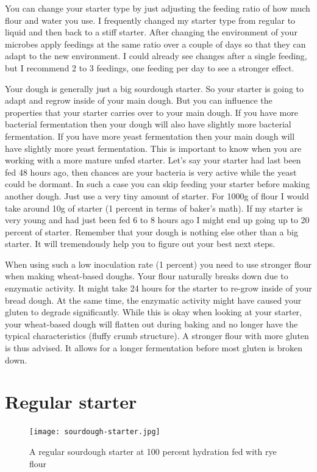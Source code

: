 You can change your starter type by just adjusting the feeding ratio of how
much flour and water you use. I frequently changed my starter type from
regular to liquid and then back to a stiff starter. After changing the
environment of your microbes apply feedings at the same ratio over a couple of
days so that they can adapt to the new environment. I could already see
changes after a single feeding, but I recommend 2 to 3 feedings, one feeding per
day to see a stronger effect.

Your dough is generally just a big sourdough starter. So your starter is going
to adapt and regrow inside of your main dough. But you can influence the
properties that your starter carries over to your main dough. If you have more
bacterial fermentation then your dough will also have slightly more bacterial
fermentation. If you have more yeast fermentation then your main dough will
have slightly more yeast fermentation. This is important to know when you are
working with a more mature unfed starter. Let's say your starter had last been
fed 48 hours ago, then chances are your bacteria is very active while the
yeast could be dormant. In such a case you can skip feeding your starter
before making another dough. Just use a very tiny amount of starter. For 1000g
of flour I would take around 10g of starter (1 percent in terms of baker's
math). If my starter is very young and had just been fed 6 to 8 hours ago I might
end up going up to 20 percent of starter. Remember that your dough is nothing
else other than a big starter. It will tremendously help you to figure out
your best next steps.

When using such a low inoculation rate (1 percent) you need to use stronger
flour when making wheat-based doughs. Your flour naturally breaks down due
to enzymatic activity. It might take 24 hours for the starter to re-grow
inside of your bread dough. At the same time, the enzymatic activity might
have caused your gluten to degrade significantly. While this is okay
when looking at your starter, your wheat-based dough will flatten
out during baking and no longer have the typical characteristics (fluffy crumb
structure). A stronger flour with more gluten is thus advised. It allows for
a longer fermentation before most gluten is broken down.

\section{Regular starter}

\begin{figure}[!htb]
  \texttt{[image: sourdough-starter.jpg]}
  \caption{A regular sourdough starter at 100 percent hydration fed with rye flour}
  \label{fig:regular-sourdough-starter}
\end{figure}

